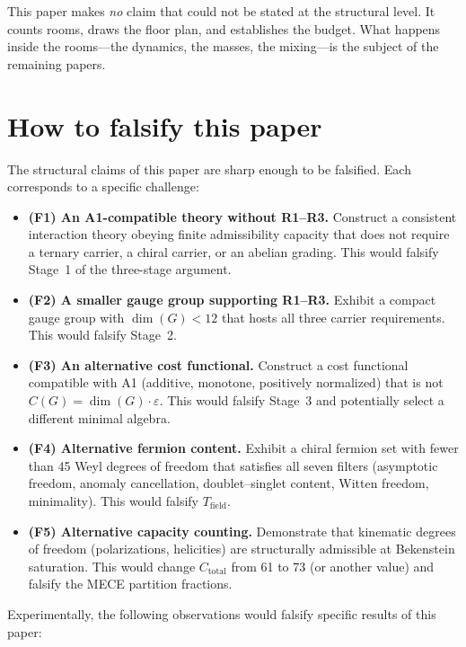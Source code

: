 \documentclass[11pt]{article}
\newenvironment{varlist}{\begin{itemize}[nosep,leftmargin=2em]}{\end{itemize}}
\begin{document}
This paper makes \emph{no} claim that could not be stated at the structural level.  It counts rooms, draws the floor plan, and establishes the budget.  What happens inside the rooms---the dynamics, the masses, the mixing---is the subject of the remaining papers.


\section{How to falsify this paper}
\label{sec:falsify}

The structural claims of this paper are sharp enough to be falsified.  Each corresponds to a specific challenge:

\begin{varlist}
\item \textbf{(F1) An A1-compatible theory without R1--R3.}  Construct a consistent interaction theory obeying finite admissibility capacity that does not require a ternary carrier, a chiral carrier, or an abelian grading.  This would falsify Stage~1 of the three-stage argument.
\item \textbf{(F2) A smaller gauge group supporting R1--R3.}  Exhibit a compact gauge group with $\dim(G) < 12$ that hosts all three carrier requirements.  This would falsify Stage~2.
\item \textbf{(F3) An alternative cost functional.}  Construct a cost functional compatible with A1 (additive, monotone, positively normalized) that is not $C(G) = \dim(G) \cdot \varepsilon$.  This would falsify Stage~3 and potentially select a different minimal algebra.
\item \textbf{(F4) Alternative fermion content.}  Exhibit a chiral fermion set with fewer than 45 Weyl degrees of freedom that satisfies all seven filters (asymptotic freedom, anomaly cancellation, doublet--singlet content, Witten freedom, minimality).  This would falsify $T_{\mathrm{field}}$.
\item \textbf{(F5) Alternative capacity counting.}  Demonstrate that kinematic degrees of freedom (polarizations, helicities) are structurally admissible at Bekenstein saturation.  This would change $C_{\mathrm{total}}$ from 61 to 73 (or another value) and falsify the MECE partition fractions.
\end{varlist}

Experimentally, the following observations would falsify specific results of this paper:
\end{document}
